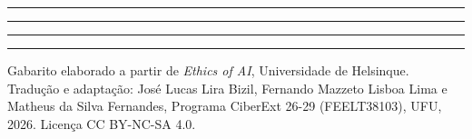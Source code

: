 \documentclass[
  11pt,
]{article}
\newcommand{\faixaEixos}[1][\linewidth]{%
  \noindent
  \textcolor{iaConceitos}{\rule{0.3333#1}{4pt}}%
  \textcolor{iaAplic}{\rule{0.3333#1}{4pt}}%
  \textcolor{iaRiscos}{\rule{0.3333#1}{4pt}}%
  \par}
\newenvironment{licenca}
  {\par\vspace{2em}\faixaEixos\par\vspace{0.8em}
   \begingroup\sffamily\scriptsize\color{iaTintaFraca}}
  {\endgroup\par}
\begin{document}
\begin{center}\rule{0.5\linewidth}{0.5pt}\end{center}

\begin{licenca}

Gabarito elaborado a partir de \emph{Ethics of AI}, Universidade de
Helsinque. Tradução e adaptação: José Lucas Lira Bizil, Fernando Mazzeto
Lisboa Lima e Matheus da Silva Fernandes, Programa CiberExt 26-29
(FEELT38103), UFU, 2026. Licença CC BY-NC-SA 4.0.

\end{licenca}
\end{document}
